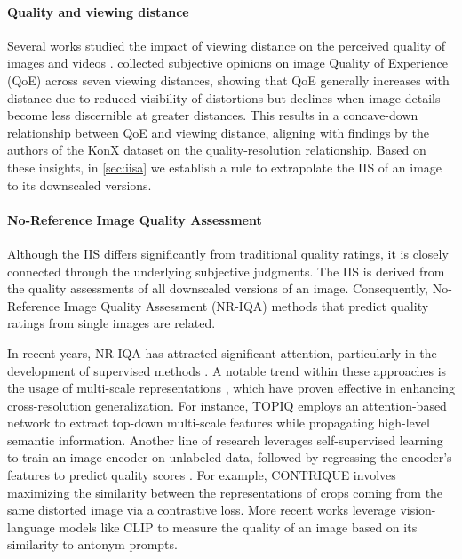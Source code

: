 \paragraph{Quality and viewing distance} Several works studied the impact of viewing distance on the perceived quality of images \cite{liu2014cid, gu2015quality, fang2015evaluation} and videos \cite{hammou2024effect, keller2023influence, kufa2019visual}. \citet{fang2015evaluation} collected subjective opinions on image Quality of Experience (QoE) across seven viewing distances, showing that QoE generally increases with distance due to reduced visibility of distortions but declines when image details become less discernible at greater distances. This results in a concave-down relationship between QoE and viewing distance, aligning with findings by the authors of the KonX dataset \cite{wiedemann2023konx} on the quality-resolution relationship. Based on these insights, in \cref{sec:iisa} we establish a rule to extrapolate the IIS of an image to its downscaled versions.

\paragraph{No-Reference Image Quality Assessment}
Although the IIS differs significantly from traditional quality ratings, it is closely connected through the underlying subjective judgments. The IIS is derived from the quality assessments of all downscaled versions of an image. Consequently, No-Reference Image Quality Assessment (NR-IQA) methods that predict quality ratings from single images are related.

In recent years, NR-IQA has attracted significant attention, particularly in the development of supervised methods \cite{su2020blindly, ke2021musiq, chen2024topiq, golestaneh2022no, wiedemann2023konx}. A notable trend within these approaches is the usage of multi-scale representations \cite{ke2021musiq, wiedemann2023konx, chen2024topiq}, which have proven effective in enhancing cross-resolution generalization. For instance, TOPIQ \cite{chen2024topiq} employs an attention-based network to extract top-down multi-scale features while propagating high-level semantic information.
Another line of research leverages self-supervised learning to train an image encoder on unlabeled data, followed by regressing the encoder’s features to predict quality scores \cite{madhusudana2022image, agnolucci2024arniqa, zhao2023quality, saha2023re}. For example, CONTRIQUE \cite{madhusudana2022image} involves maximizing the similarity between the representations of crops coming from the same distorted image via a contrastive loss.
More recent works \cite{wang2023exploring, agnolucci2024quality, zhang2023blind} leverage vision-language models like CLIP \cite{radford2021learning} to measure the quality of an image based on its similarity to antonym prompts.


